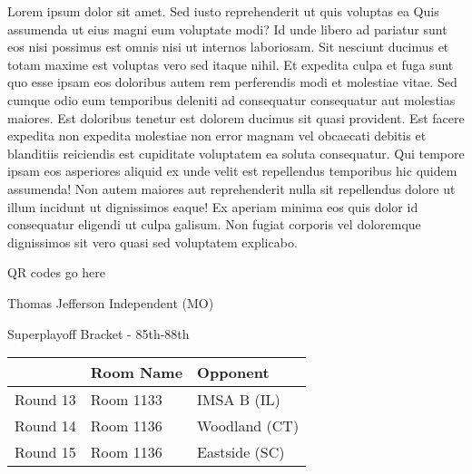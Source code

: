 \documentclass{article}%
\begin{document}
\vspace*{8pt}%
\linebreak%
\newline%
\newline%
Lorem ipsum dolor sit amet. Sed iusto reprehenderit ut quis voluptas ea Quis assumenda ut eius magni eum voluptate modi? Id unde libero ad pariatur sunt eos nisi possimus est omnis nisi ut internos laboriosam. Sit nesciunt ducimus et totam maxime est voluptas vero sed itaque nihil. Et expedita culpa et fuga sunt quo esse ipsam eos doloribus autem rem perferendis modi et molestiae vitae.\newline%
\newline%
Sed cumque odio eum temporibus deleniti ad consequatur consequatur aut molestias maiores. Est doloribus tenetur est dolorem ducimus sit quasi provident. Est facere expedita non expedita molestiae non error magnam vel obcaecati debitis et blanditiis reiciendis est cupiditate voluptatem ea soluta consequatur. Qui tempore ipsam eos asperiores aliquid ex unde velit est repellendus temporibus hic quidem assumenda!\newline%
\newline%
Non autem maiores aut reprehenderit nulla sit repellendus dolore ut illum incidunt ut dignissimos eaque! Ex aperiam minima eos quis dolor id consequatur eligendi ut culpa galisum. Non fugiat corporis vel doloremque dignissimos sit vero quasi sed voluptatem explicabo.\newline%
\newline%
%
\vspace*{30pt}%
\begin{center}%
\begin{Huge}%
QR codes go here%
\end{Huge}%
\end{center}%
\newpage%
\begin{center}%
\begin{Huge}%
Thomas Jefferson Independent (MO)%
\end{Huge}%
\vspace*{8pt}%
\linebreak%
\begin{Large}%
Superplayoff Bracket {-} 85th{-}88th%
\end{Large}%
\end{center}%
%
\begin{tabularx}{\textwidth}{|c|Y|Y|}%
\hline%
&Room Name&Opponent\\%
\hline%
Round 13&Room 1133&IMSA B (IL)\\%
Round 14&Room 1136&Woodland (CT)\\%
Round 15&Room 1136&Eastside (SC)\\%
\hline%
\end{tabularx}%
\end{document}
